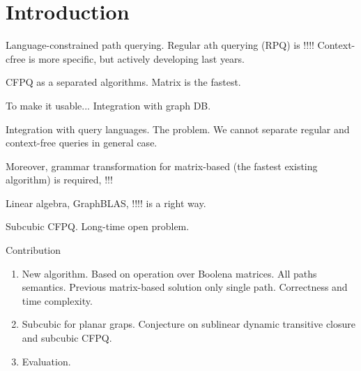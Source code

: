 \section{Introduction}


Language-constrained path querying. 
Regular ath querying (RPQ) is !!!!
Context-cfree is more specific, but actively developing last years.

CFPQ as a separated algorithms. Matrix is the fastest. 

To make it usable... Integration with graph DB.

Integration with query languages. 
The problem. We cannot separate regular and context-free queries in general case.  

Moreover, grammar transformation for matrix-based (the fastest existing algorithm) is required, !!!

Linear algebra, GraphBLAS, !!!! is a right way.

Subcubic CFPQ. Long-time open problem.

Contribution
\begin{enumerate}
	\item New algorithm. Based on operation over Boolena matrices. All paths semantics. Previous matrix-based solution only single path. Correctness and time complexity.
	\item Subcubic for planar graps. Conjecture on sublinear dynamic transitive closure and subcubic CFPQ. 
	\item Evaluation.
\end{enumerate}